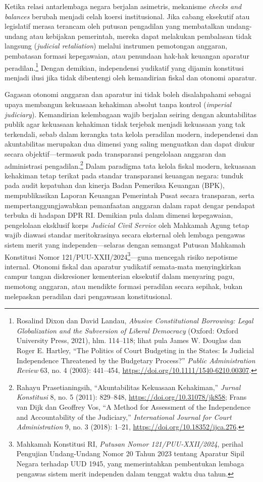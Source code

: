 \documentclass[12pt,a4paper,twocolumn]{article}
\begin{document}
Ketika relasi antarlembaga negara berjalan asimetris, mekanisme \textit{checks and balances} berubah menjadi celah koersi institusional. Jika cabang eksekutif atau legislatif merasa terancam oleh putusan pengadilan yang membatalkan undang-undang atau kebijakan pemerintah, mereka dapat melakukan pembalasan tidak langsung (\textit{judicial retaliation}) melalui instrumen pemotongan anggaran, pembatasan formasi kepegawaian, atau penundaan hak-hak keuangan aparatur peradilan.\footnote{Rosalind Dixon dan David Landau, \textit{Abusive Constitutional Borrowing: Legal Globalization and the Subversion of Liberal Democracy} (Oxford: Oxford University Press, 2021), hlm. 114--118; lihat pula James W. Douglas dan Roger E. Hartley, ``The Politics of Court Budgeting in the States: Is Judicial Independence Threatened by the Budgetary Process?'' \textit{Public Administration Review} 63, no. 4 (2003): 441--454, \url{https://doi.org/10.1111/1540-6210.00307}.} Dengan demikian, independensi yudikatif yang dijamin konstitusi menjadi ilusi jika tidak dibentengi oleh kemandirian fiskal dan otonomi aparatur.

Gagasan otonomi anggaran dan aparatur ini tidak boleh disalahpahami sebagai upaya membangun kekuasaan kehakiman absolut tanpa kontrol (\textit{imperial judiciary}). Kemandirian kelembagaan wajib berjalan seiring dengan akuntabilitas publik agar kekuasaan kehakiman tidak terjebak menjadi kekuasaan yang tak terkendali, sebab dalam kerangka tata kelola peradilan modern, independensi dan akuntabilitas merupakan dua dimensi yang saling menguatkan dan dapat diukur secara objektif—termasuk pada transparansi pengelolaan anggaran dan administrasi pengadilan.\footnote{Rahayu Prasetianingsih, ``Akuntabilitas Kekuasaan Kehakiman,'' \textit{Jurnal Konstitusi} 8, no. 5 (2011): 829--848, \url{https://doi.org/10.31078/jk858}; Frans van Dijk dan Geoffrey Vos, ``A Method for Assessment of the Independence and Accountability of the Judiciary,'' \textit{International Journal for Court Administration} 9, no. 3 (2018): 1--21, \url{https://doi.org/10.18352/ijca.276}.} Dalam paradigma tata kelola fiskal modern, kekuasaan kehakiman tetap terikat pada standar transparansi keuangan negara: tunduk pada audit kepatuhan dan kinerja Badan Pemeriksa Keuangan (BPK), mempublikasikan Laporan Keuangan Pemerintah Pusat secara transparan, serta mempertanggungjawabkan pemanfaatan anggaran dalam rapat dengar pendapat terbuka di hadapan DPR RI. Demikian pula dalam dimensi kepegawaian, pengelolaan eksklusif korps \textit{Judicial Civil Service} oleh Mahkamah Agung tetap wajib diawasi standar meritokrasinya secara eksternal oleh lembaga pengawas sistem merit yang independen—selaras dengan semangat Putusan Mahkamah Konstitusi Nomor 121/PUU-XXII/2024\footnote{Mahkamah Konstitusi RI, \textit{Putusan Nomor 121/PUU-XXII/2024}, perihal Pengujian Undang-Undang Nomor 20 Tahun 2023 tentang Aparatur Sipil Negara terhadap UUD 1945, yang memerintahkan pembentukan lembaga pengawas sistem merit independen dalam tenggat waktu dua tahun.}—guna mencegah risiko nepotisme internal. Otonomi fiskal dan aparatur yudikatif semata-mata menyingkirkan campur tangan diskresioner kementerian eksekutif dalam menyaring pagu, memotong anggaran, atau mendikte formasi peradilan secara sepihak, bukan melepaskan peradilan dari pengawasan konstitusional.
\end{document}
